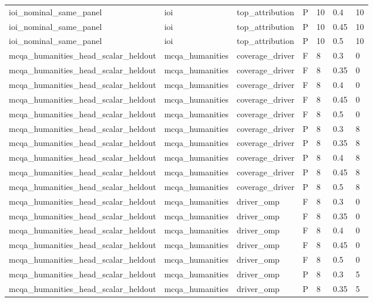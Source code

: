 \begin{tabular}{lllllll}
ioi\_nominal\_same\_panel & ioi & top\_attribution & P & 10 & 0.4 & 10 \\
ioi\_nominal\_same\_panel & ioi & top\_attribution & P & 10 & 0.45 & 10 \\
ioi\_nominal\_same\_panel & ioi & top\_attribution & P & 10 & 0.5 & 10 \\
mcqa\_humanities\_head\_scalar\_heldout & mcqa\_humanities & coverage\_driver & F & 8 & 0.3 & 0 \\
mcqa\_humanities\_head\_scalar\_heldout & mcqa\_humanities & coverage\_driver & F & 8 & 0.35 & 0 \\
mcqa\_humanities\_head\_scalar\_heldout & mcqa\_humanities & coverage\_driver & F & 8 & 0.4 & 0 \\
mcqa\_humanities\_head\_scalar\_heldout & mcqa\_humanities & coverage\_driver & F & 8 & 0.45 & 0 \\
mcqa\_humanities\_head\_scalar\_heldout & mcqa\_humanities & coverage\_driver & F & 8 & 0.5 & 0 \\
mcqa\_humanities\_head\_scalar\_heldout & mcqa\_humanities & coverage\_driver & P & 8 & 0.3 & 8 \\
mcqa\_humanities\_head\_scalar\_heldout & mcqa\_humanities & coverage\_driver & P & 8 & 0.35 & 8 \\
mcqa\_humanities\_head\_scalar\_heldout & mcqa\_humanities & coverage\_driver & P & 8 & 0.4 & 8 \\
mcqa\_humanities\_head\_scalar\_heldout & mcqa\_humanities & coverage\_driver & P & 8 & 0.45 & 8 \\
mcqa\_humanities\_head\_scalar\_heldout & mcqa\_humanities & coverage\_driver & P & 8 & 0.5 & 8 \\
mcqa\_humanities\_head\_scalar\_heldout & mcqa\_humanities & driver\_omp & F & 8 & 0.3 & 0 \\
mcqa\_humanities\_head\_scalar\_heldout & mcqa\_humanities & driver\_omp & F & 8 & 0.35 & 0 \\
mcqa\_humanities\_head\_scalar\_heldout & mcqa\_humanities & driver\_omp & F & 8 & 0.4 & 0 \\
mcqa\_humanities\_head\_scalar\_heldout & mcqa\_humanities & driver\_omp & F & 8 & 0.45 & 0 \\
mcqa\_humanities\_head\_scalar\_heldout & mcqa\_humanities & driver\_omp & F & 8 & 0.5 & 0 \\
mcqa\_humanities\_head\_scalar\_heldout & mcqa\_humanities & driver\_omp & P & 8 & 0.3 & 5 \\
mcqa\_humanities\_head\_scalar\_heldout & mcqa\_humanities & driver\_omp & P & 8 & 0.35 & 5 \\

\end{tabular}
